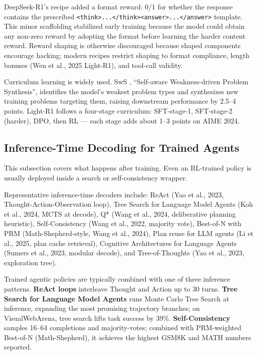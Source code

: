 \documentclass{article}
\begin{document}
DeepSeek-R1's recipe added a format reward: 0/1 for whether the response contains the prescribed \texttt{\textless{}think\textgreater{}...\textless{}/think\textgreater{}\textless{}answer\textgreater{}...\textless{}/answer\textgreater{}} template. This minor scaffolding stabilized early training because the model could obtain any non-zero reward by adopting the format before learning the harder content reward. Reward shaping is otherwise discouraged because shaped components encourage hacking; modern recipes restrict shaping to format compliance, length bonuses (Wen et al., 2025 Light-R1), and tool-call validity.

Curriculum learning is widely used. SwS \citep{liang20252025}, ``Self-aware Weakness-driven Problem Synthesis'', identifies the model's weakest problem types and synthesizes new training problems targeting them, raising downstream performance by 2.5--4 points. Light-R1 \citep{wen20252025} follows a four-stage curriculum: SFT-stage-1, SFT-stage-2 (harder), DPO, then RL --- each stage adds about 1--3 points on AIME 2024.

\subsection{Inference-Time Decoding for Trained Agents}\label{inference-time-decoding-for-trained-agents}

This subsection covers what happens after training. Even an RL-trained policy is usually deployed inside a search or self-consistency wrapper.

Representative inference-time decoders include: ReAct (Yao et al., 2023, Thought-Action-Observation loop), Tree Search for Language Model Agents (Koh et al., 2024, MCTS at decode), Q* (Wang et al., 2024, deliberative planning heuristic), Self-Consistency (Wang et al., 2022, majority vote), Best-of-N with PRM (Math-Shepherd-style, Wang et al., 2024), Plan reuse for LLM agents (Li et al., 2025, plan cache retrieval), Cognitive Architectures for Language Agents (Sumers et al., 2023, modular decode), and Tree-of-Thoughts (Yao et al., 2023, exploration tree).

Trained agentic policies are typically combined with one of three inference patterns. \textbf{ReAct loops} \citep{yao20232023} interleave Thought and Action up to 30 turns. \textbf{Tree Search for Language Model Agents} \citep{koh20242024} runs Monte Carlo Tree Search at inference, expanding the most promising trajectory branches; on VisualWebArena, tree search lifts task success by 39\%. \textbf{Self-Consistency} \citep{wang20232023} samples 16--64 completions and majority-votes; combined with PRM-weighted Best-of-N (Math-Shepherd), it achieves the highest GSM8K and MATH numbers reported.
\end{document}
